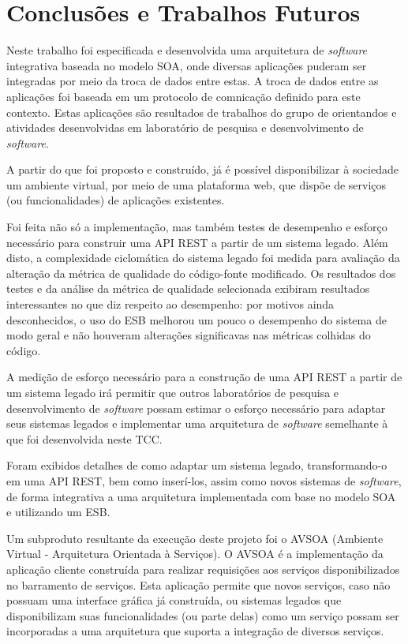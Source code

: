 \chapter[Conclusões e Trabalhos Futuros]{Conclusões e Trabalhos Futuros}

Neste trabalho foi especificada e desenvolvida uma arquitetura de \textit{software} integrativa baseada no modelo SOA, onde diversas aplicações puderam ser integradas por meio da troca de dados entre estas. A troca de dados entre as aplicações foi baseada em um protocolo de comnicação definido para este contexto. Estas aplicações são resultados de trabalhos do grupo de orientandos e atividades desenvolvidas em laboratório de pesquisa e desenvolvimento de \textit{software}.

A partir do que foi proposto e construído, já é possível disponibilizar à sociedade um ambiente virtual, por meio de uma plataforma web, que dispõe de serviços (ou funcionalidades) de aplicações existentes.

Foi feita não só a implementação, mas também testes de desempenho e esforço necessário para construir uma API REST a partir de um sistema legado. Além disto, a complexidade ciclomática do sistema legado foi medida para avaliação da alteração da métrica de qualidade do código-fonte modificado. Os resultados dos testes e da análise da métrica de qualidade selecionada exibiram resultados interessantes no que diz respeito ao desempenho: por motivos ainda desconhecidos, o uso do ESB melhorou um pouco o desempenho do sistema de modo geral e não houveram alterações significavas nas métricas colhidas do código.

A medição de esforço necessário para a construção de uma API REST a partir de um sistema legado irá permitir que outros laboratórios de pesquisa e desenvolvimento de \textit{software} possam estimar o esforço necessário para adaptar seus sistemas legados e implementar uma arquitetura de \textit{software} semelhante à que foi desenvolvida neste TCC.

Foram exibidos detalhes de como adaptar um sistema legado, transformando-o em uma API REST, bem como inserí-los, assim como novos sistemas de \textit{software}, de forma integrativa a uma arquitetura implementada com base no modelo SOA e utilizando um ESB.

Um subproduto resultante da execução deste projeto foi o AVSOA (Ambiente Virtual - Arquitetura Orientada à Serviços). O AVSOA é a implementação da aplicação cliente construída para realizar requisições aos serviços disponibilizados no barramento de serviços. Esta aplicação permite que novos serviços, caso não possuam uma interface gráfica já construída, ou sistemas legados que disponibilizam suas funcionalidades (ou parte delas) como um serviço possam ser incorporadas a uma arquitetura que suporta a integração de diversos serviços.


